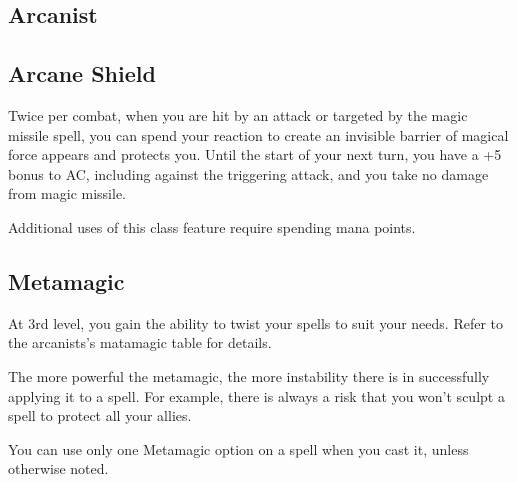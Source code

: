 
\begin{multicols*}{2}

\section{Arcanist}

\subsection*{Arcane Shield}

Twice per combat, when you are hit by an attack or targeted by the magic missile spell, you can spend your reaction to create an invisible barrier of magical force appears and protects you. Until the start of your next turn, you have a +5 bonus to AC, including against the triggering attack, and you take no damage from magic missile.

Additional uses of this class feature require spending mana points.

\subsection*{Metamagic}

At 3rd level, you gain the ability to twist your spells to suit your needs. Refer to the arcanists's matamagic table for details.

The more powerful the metamagic, the more instability there is in successfully applying it to a spell. For example, there is always a risk that you won't sculpt a spell to protect all your allies.

You can use only one Metamagic option on a spell when you cast it, unless otherwise noted.


\end{multicols*}
